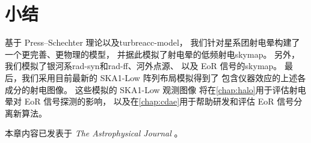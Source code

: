\section{小结}

基于 Press--Schechter 理论以及\ac{turbreacc-model}，
我们针对星系团射电晕构建了一个更完善、更物理的模型，
并据此模拟了射电晕的低频射电\ac{skymap}。
另外，我们模拟了银河系\ac{rad-syn}和\ac{rad-ff}、河外点源、
以及 EoR 信号的\ac{skymap}。
最后，我们采用目前最新的 SKA1-Low 阵列布局模拟得到了
包含仪器效应的上述各成分的射电图像。
这些模拟的 SKA1-Low 观测图像
将在\autoref{chap:halo}用于评估射电晕对 EoR 信号探测的影响，
以及在\autoref{chap:cdae}用于帮助研发和评估 EoR 信号分离新算法。

本章内容已发表于 \textit{The Astrophysical Journal} \cite{li.halo}。

